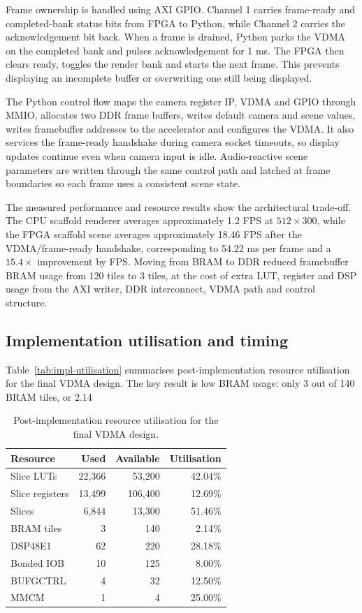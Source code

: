 Frame ownership is handled using AXI GPIO. Channel 1 carries frame-ready and completed-bank status bits from FPGA to Python, while Channel 2 carries the acknowledgement bit back. When a frame is drained, Python parks the VDMA on the completed bank and pulses acknowledgement for 1 ms. The FPGA then clears ready, toggles the render bank and starts the next frame. This prevents displaying an incomplete buffer or overwriting one still being displayed.

The Python control flow maps the camera register IP, VDMA and GPIO through MMIO, allocates two DDR frame buffers, writes default camera and scene values, writes framebuffer addresses to the accelerator and configures the VDMA. It also services the frame-ready handshake during camera socket timeouts, so display updates continue even when camera input is idle. Audio-reactive scene parameters are written through the same control path and latched at frame boundaries so each frame uses a consistent scene state.

The measured performance and resource results show the architectural trade-off. The CPU scaffold renderer averages approximately 1.2 FPS at $512 \times 300$, while the FPGA scaffold scene averages approximately 18.46 FPS after the VDMA/frame-ready handshake, corresponding to 54.22 ms per frame and a $15.4\times$ improvement by FPS. Moving from BRAM to DDR reduced framebuffer BRAM usage from 120 tiles to 3 tiles, at the cost of extra LUT, register and DSP usage from the AXI writer, DDR interconnect, VDMA path and control structure.

\subsection{Implementation utilisation and timing}

Table~\ref{tab:impl-utilisation} summarises post-implementation resource utilisation for the final VDMA design. The key result is low BRAM usage: only 3 out of 140 BRAM tiles, or 2.14%

\begin{table}[htbp]
\centering
\caption{Post-implementation resource utilisation for the final VDMA design.}
\label{tab:impl_utilisation}
\begin{tabular}{|l|r|r|r|}
\hline
Resource & Used & Available & Utilisation \\
\hline
Slice LUTs & 22,366 & 53,200 & 42.04\% \\
Slice registers & 13,499 & 106,400 & 12.69\% \\
Slices & 6,844 & 13,300 & 51.46\% \\
BRAM tiles & 3 & 140 & 2.14\% \\
DSP48E1 & 62 & 220 & 28.18\% \\
Bonded IOB & 10 & 125 & 8.00\% \\
BUFGCTRL & 4 & 32 & 12.50\% \\
MMCM & 1 & 4 & 25.00\% \\
\hline
\end{tabular}
\end{table}

